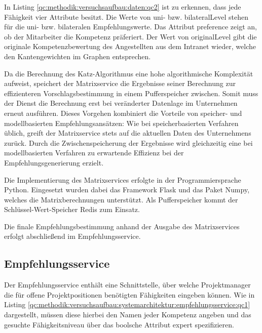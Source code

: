 In Listing \ref{qc:methodik:versuchsaufbau:daten:qc2} ist zu erkennen, dass jede Fähigkeit vier Attribute besitzt. Die Werte von uni- bzw. bilateralLevel stehen für die uni- bzw. bilateralen Empfehlungswerte. Das Attribut preference zeigt an, ob der Mitarbeiter die Kompetenz präferiert. Der Wert von originalLevel gibt die originale Kompetenzbewertung des Angestellten aus dem Intranet wieder, welche den Kantengewichten im Graphen entsprechen.

Da die Berechnung des Katz-Algorithmus eine hohe algorithmische Komplexität aufweist, speichert der Matrixservice die Ergebnisse seiner Berechnung zur effizienteren Vorschlagsbestimmung in einem Pufferspeicher zwischen. Somit muss der Dienst die Berechnung erst bei veränderter Datenlage im Unternehmen erneut ausführen. Dieses Vorgehen kombiniert die Vorteile von speicher- und modellbasierten Empfehlungsansätzen: Wie bei speicherbasierten Verfahren üblich, greift der Matrixservice stets auf die aktuellen Daten des Unternehmens zurück. Durch die Zwischenspeicherung der Ergebnisse wird gleichzeitig eine bei modellbasierten Verfahren zu erwartende Effizienz bei der Empfehlungsgenerierung erzielt.

Die Implementierung des Matrixservices erfolgte in der Programmiersprache Python. Eingesetzt wurden dabei das Framework Flask und das Paket Numpy, welches die Matrixberechnungen unterstützt. Als Pufferspeicher kommt der Schlüssel-Wert-Speicher Redis zum Einsatz.

Die finale Empfehlungsbestimmung anhand der Ausgabe des Matrixservices erfolgt abschließend im Empfehlungsservice.

\subsection{Empfehlungsservice}
\label{ch:methodik:versuchsaufbau:systemarchitektur:empfehlungsservice}
Der Empfehlungsservice enthält eine Schnittstelle, über welche Projektmanager die für offene Projektpositionen benötigten Fähigkeiten eingeben können. Wie in Listing \ref{qc:methodik:versuchsaufbau:systemarchitektur:empfehlungsservice:qc1} dargestellt, müssen diese hierbei den Namen jeder Kompetenz angeben und das gesuchte Fähigkeitsniveau über das boolsche Attribut expert spezifizieren. 



